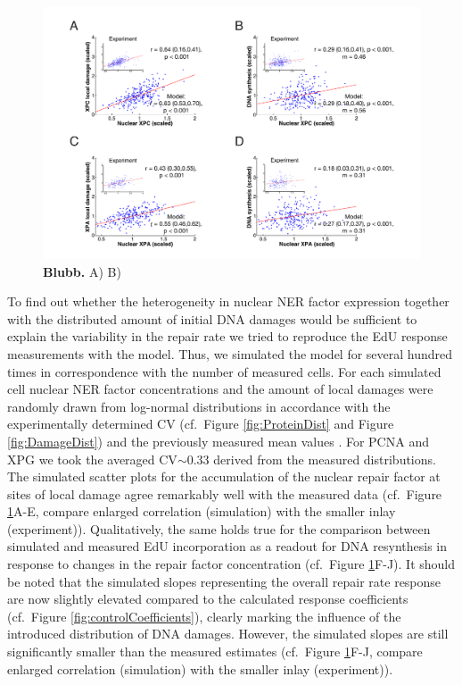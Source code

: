 \begin{figure}[htbp]
	\begin{center}
		\includegraphics[width=1\textwidth]{Abbildungen/figure3_6.pdf}
		\caption{\textbf{Blubb.} A) B) }
		\label{fig:Model_dataComp}
	\end{center}
\end{figure}
To find out whether the heterogeneity in nuclear NER factor expression together with the distributed amount of initial DNA damages would be sufficient to explain the variability in the repair rate we tried to reproduce the EdU response measurements with the model. Thus, we simulated the model for several hundred times in correspondence with the number of measured cells. For each simulated cell nuclear NER factor concentrations and the amount of local damages were randomly drawn from log-normal distributions in accordance with the experimentally determined CV (cf.\ Figure \ref{fig:ProteinDist} and Figure \ref{fig:DamageDist}) and the previously measured mean values \cite{Luijsterburg2010}. For PCNA and XPG we took the averaged CV$\sim$0.33 derived from the measured distributions. The simulated scatter plots for the accumulation of the nuclear repair factor at sites of local damage agree remarkably well with the measured data (cf.\ Figure \ref{fig:Model_dataComp}A-E, compare enlarged correlation (simulation) with the smaller inlay (experiment)). Qualitatively, the same holds true for the comparison between simulated and measured EdU incorporation as a readout for DNA resynthesis in response to changes in the repair factor concentration (cf.\ Figure \ref{fig:Model_dataComp}F-J). It should be noted that the simulated slopes representing the overall repair rate response are now slightly elevated compared to the calculated response coefficients (cf.\ Figure \ref{fig:controlCoefficients}), clearly marking the influence of the introduced distribution of DNA damages. However, the simulated slopes are still significantly smaller than the measured estimates (cf.\ Figure \ref{fig:Model_dataComp}F-J, compare enlarged correlation (simulation) with the smaller inlay (experiment)).\\    
